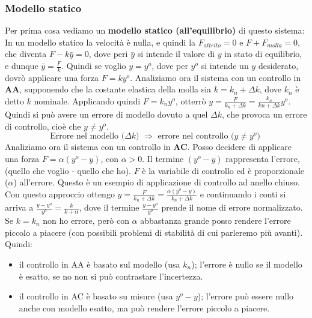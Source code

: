 \subsubsection*{Modello statico}
Per prima cosa vediamo un \textbf{modello statico (all'equilibrio)} di questo sistema:\newline
In un modello statico la velocità è nulla, e quindi la $F_{attrito} = 0$ e $F + F_{molla} = 0$, che diventa $F-k \bar{y} = 0$, dove peri $\bar{y}$ si intende il valore di $y$ in stato di equilibrio, e dunque $\bar{y} = \frac{F}{k}$.\newline
Quindi se voglio $y = y^o$, dove per $y^o$ si intende un $y$ desiderato, dovrò applicare una forza $F = k y^o$.\newline
\newline
Analiziamo ora il sistema con un controllo in \textbf{AA}, supponendo che la costante elastica della molla sia $k = k_n + \Delta k$, dove $k_n$ è detto $k$ nominale.\newline
Applicando quindi $F = k_n y^o$, otterrò $y = \frac{F}{k_n + \Delta k} = \frac{k_n}{kn + \Delta k} y^o$. Quindi si può avere un errore di modello dovuto a quel $\Delta k$, che provoca un errore di controllo, cioè che $y \neq y^o$.\newline
\[
    \text{Errore nel modello ($\Delta k$) $\Longrightarrow$ errore nel controllo ($y \neq y^o$)}\;
\]
\newline
Analiziamo ora il sistema con un controllo in \textbf{AC}.\newline
Posso decidere di applicare una forza $F = \alpha (y^o -y)$, con $\alpha>0$. Il termine $(y^o - y)$ rappresenta l'errore, (quello che voglio - quello che ho). $F$ è la variabile di controllo ed è proporzionale ($\alpha$) all'errore.\newline
Questo è un esempio di applicazione di controllo ad anello chiuso.\newline
Con questo approccio ottengo $y = \frac{F}{k_n + \Delta k} = \frac{\alpha (y^o - y)}{k_n + \Delta k}$ e continuando i conti si arriva a $\frac{y - y^o}{y^o} = \frac{k}{k+\alpha}$, dove il termine $\frac{y-y^o}{y^o}$ prende il nome di errore normalizzato. Se $k = k_n$ non ho errore, però con $\alpha$ abbastanza grande posso rendere l'errore piccolo a piacere (con possibili problemi di stabilità di cui parleremo più avanti).\newline
\newline
Quindi:
\begin{itemize}
    \item  il controllo in AA è basato sul modello (usa $k_n$); l'errore è nullo se il modello è esatto, se no non si può contrastare l'incertezza.
    \item il controllo in AC è basato su misure (usa $y^o-y$); l'errore può essere nullo anche con modello esatto, ma può rendere l'errore piccolo a piacere.
\end{itemize}
